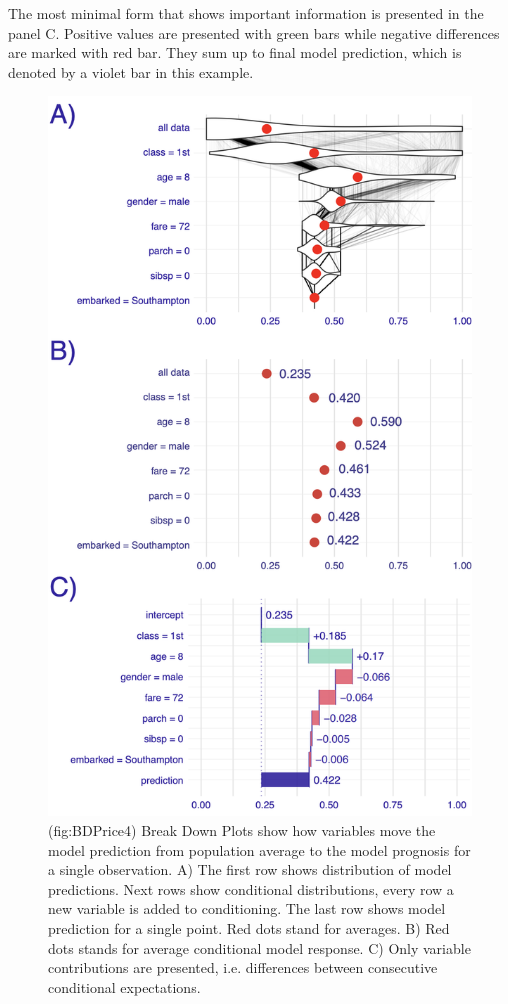 \documentclass[12pt,]{krantz}
\theoremstyle{definition}
\theoremstyle{definition}
\theoremstyle{definition}
\theoremstyle{remark}
\begin{document}
The most minimal form that shows important information is presented in
the panel C. Positive values are presented with green bars while
negative differences are marked with red bar. They sum up to final model
prediction, which is denoted by a violet bar in this example.

\begin{figure}

{\centering \includegraphics[width=0.8\linewidth]{figure/break_down_distr} 

}

\caption{(fig:BDPrice4) Break Down Plots show how variables move the model prediction from population average to the model prognosis for a single observation. A) The first row shows distribution of model predictions. Next rows show conditional distributions, every row a new variable is added to conditioning. The last row shows model prediction for a single point. Red dots stand for averages. B) Red dots stands for average conditional model response. C) Only variable contributions are presented, i.e. differences between consecutive conditional expectations. }\label{fig:BDPrice4}
\end{figure}
\end{document}
